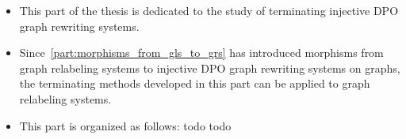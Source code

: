 \begin{itemize}
    \item This part of the thesis is dedicated to the study of terminating injective DPO graph rewriting systems.
    \item Since~\autoref{part:morphisms_from_gls_to_grs} has introduced morphisms from graph relabeling systems to injective DPO graph rewriting systems on graphs, the terminating methods developed in this part can be applied to graph relabeling systems.
    \item This part is organized as follows: todo todo 
\end{itemize}